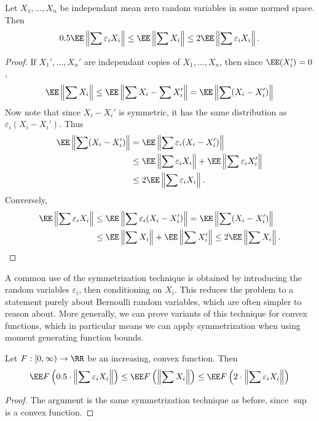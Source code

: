 \begin{lemma}
    Let $X_1, \dots, X_n$ be independant mean zero random variables in some normed space. Then
    \[ 0.5 \EE \left\| \sum \varepsilon_i X_i \right\| \leq \EE \left\| \sum X_i \right\| \leq 2 \EE \left\| \sum \varepsilon_i X_i \right\|. \]
\end{lemma}
\begin{proof}
    If $X_1', \dots, X_n'$ are independant copies of $X_1, \dots, X_n$, then since $\EE(X_i') = 0$,
    \[ \EE \left\| \sum X_i \right\| \leq \EE \left\| \sum X_i - \sum X_i' \right\| = \EE \left\| \sum (X_i - X_i') \right\| \]
    Now note that since $X_i - X_i'$ is symmetric, it has the same distribution as $\varepsilon_i(X_i - X_i')$. Thus
    \begin{align*}
        \EE \left\| \sum (X_i - X_i') \right\| &= \EE \left\| \sum \varepsilon_i(X_i - X_i') \right\|\\
        &\leq \EE \left\| \sum \varepsilon_i X_i \right\| + \EE \left\| \sum \varepsilon_i X_i' \right\|\\
        &\leq 2 \EE \left\| \sum \varepsilon_i X_i \right\|.
    \end{align*}
    Conversely,
    \begin{align*}
        \EE \left\| \sum \varepsilon_i X_i \right\| &\leq \EE \left\| \sum \varepsilon_i (X_i - X_i') \right\| = \EE \left\| \sum (X_i - X_i') \right\|\\
        &\leq \EE \left\| \sum X_i \right\| + \EE \left\| \sum X_i' \right\| \leq 2 \EE \left\| \sum X_i \right\|. \qedhere
    \end{align*}
\end{proof}

A common use of the symmetrization technique is obtained by introducing the random variables $\varepsilon_i$, then conditioning on $X_i$. This reduces the problem to a statement purely about Bernoulli random variables, which are often simpler to reason about. More generally, we can prove variants of this technique for convex functions, which in particular means we can apply symmetrization when using moment generating function bounds.

\begin{theorem}
    Let $F: [0,\infty) \to \RR$ be an increasing, convex function. Then
    \[ \EE F \left( 0.5 \cdot \left\| \sum \varepsilon_i X_i \right\| \right) \leq \EE F \left( \left\| \sum X_i \right\| \right) \leq \EE F \left( 2 \cdot \left\| \sum \varepsilon_i X_i \right\| \right) \]
\end{theorem}
\begin{proof}
    The argument is the same symmetrization technique as before, since $\sup$ is a convex function. 
\end{proof}

